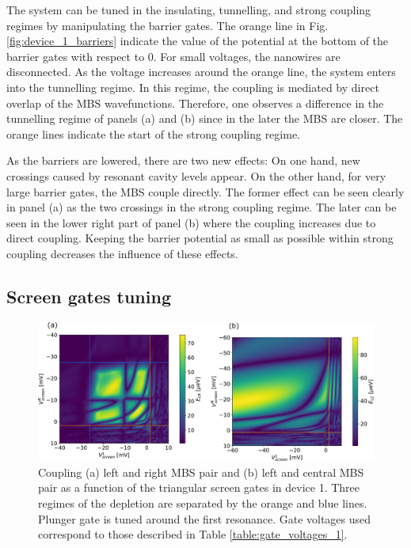 The system can be tuned in the insulating, tunnelling, and strong coupling regimes by manipulating the barrier gates.
The orange line in Fig. \ref{fig:device_1_barriers} indicate the value of the potential at the bottom of the barrier gates with respect to $0$.
For small voltages, the nanowires are disconnected.
As the voltage increases around the orange line, the system enters into the tunnelling regime.
In this regime, the coupling is mediated by direct overlap of the MBS wavefunctions.
Therefore, one observes a difference in the tunnelling regime of panels (a) and (b) since in the later the MBS are closer.
The orange lines indicate the start of the strong coupling regime.

As the barriers are lowered, there are two new effects:
On one hand, new crossings caused by resonant cavity levels appear.
On the other hand, for very large barrier gates, the MBS couple directly.
The former effect can be seen clearly in panel (a) as the two crossings in the strong coupling regime.
The later can be seen in the lower right part of panel (b) where the coupling increases due to direct coupling.
Keeping the barrier potential as small as possible within strong coupling decreases the influence of these effects.

\subsection{Screen gates tuning}

\begin{figure}
\centering
  \includegraphics[width=\linewidth]{figures/device_1_screens.pdf}
  \caption{Coupling (a) left and right MBS pair and (b) left and central MBS pair as a function of the triangular screen gates in device 1. Three regimes of the depletion are separated by the orange and blue lines. Plunger gate is tuned around the first resonance. Gate voltages used correspond to those described in Table \ref{table:gate_voltages_1}.}
  \label{fig:device_1_screens}
\end{figure}

